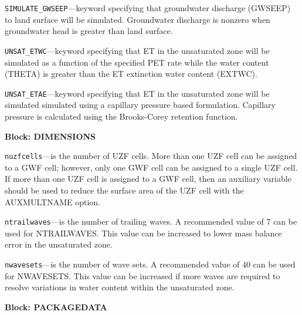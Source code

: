 \begin{description}
\item \texttt{SIMULATE\_GWSEEP}---keyword specifying that groundwater discharge (GWSEEP) to land surface will be simulated. Groundwater discharge is nonzero when groundwater head is greater than land surface.

\item \texttt{UNSAT\_ETWC}---keyword specifying that ET in the unsaturated zone will be simulated as a function of the specified PET rate while the water content (THETA) is greater than the ET extinction water content (EXTWC).

\item \texttt{UNSAT\_ETAE}---keyword specifying that ET in the unsaturated zone will be simulated simulated using a capillary pressure based formulation. Capillary pressure is calculated using the Brooks-Corey retention function.

\end{description}
\item \textbf{Block: DIMENSIONS}

\begin{description}
\item \texttt{nuzfcells}---is the number of UZF cells.  More than one UZF cell can be assigned to a GWF cell; however, only one GWF cell can be assigned to a single UZF cell. If more than one UZF cell is assigned to a GWF cell, then an auxiliary variable should be used to reduce the surface area of the UZF cell with the AUXMULTNAME option.

\item \texttt{ntrailwaves}---is the number of trailing waves.  A recommended value of 7 can be used for NTRAILWAVES.  This value can be increased to lower mass balance error in the unsaturated zone.

\item \texttt{nwavesets}---is the number of wave sets.  A recommended value of 40 can be used for NWAVESETS.  This value can be increased if more waves are required to resolve variations in water content within the unsaturated zone.

\end{description}
\item \textbf{Block: PACKAGEDATA}


